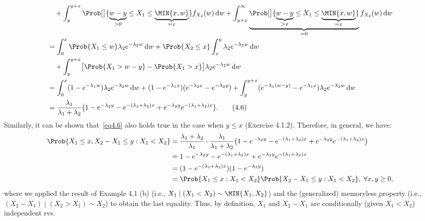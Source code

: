 \begin{Example}
\begin{align*}
         & \quad+\int_{y}^{y+x}\Prob[\big]{\underbrace{w-y}_{>0}\le X_1\le \underbrace{\MIN{x,w}}_{=x}}f_{X_2}(w)\odif{w}+\int_{y+x}^{\infty}\underbrace{\Prob[\big]{\underbrace{w-y}_{>x}\le X_1\le \underbrace{\MIN{x,w}}_{=x}}}_{=0}f_{X_2}(w)\odif{w} \\
         & =\int_{0}^{x}\Prob{X_1\le w}\lambda_2 e^{-\lambda_2 w}\odif{w}+\Prob{X_2\le x}\int_{x}^{y}\lambda_2 e^{-\lambda_2 w}\odif{w}                                                                                                                   \\
         & \quad+\int_{y}^{y+x}\bigl[\Prob{X_1>w-y}-\Prob{X_1>x}\bigr]\lambda_2 e^{-\lambda_2 w}\odif{w}                                                                                                                                                  \\
         & =\int_{0}^{x}(1-e^{-\lambda_1 w})\lambda_2 e^{-\lambda_2 w}\odif{w}+(1-e^{-\lambda_1 x})(e^{-\lambda_2 x}-e^{-\lambda_2 y})+\int_{y}^{y+x}(e^{-\lambda_1(w-y)}-e^{-\lambda_1 x})\lambda_2 e^{-\lambda_2 w}\odif{w}                             \\
         & =\frac{\lambda_1}{\lambda_1+\lambda_2}\bigl(1-e^{-\lambda_2 y}-e^{-(\lambda_1+\lambda_2)x}+e^{-\lambda_2 y}e^{-(\lambda_1+\lambda_2)x}\bigr).\tag*{(4.6)}\label{eq4.6}
    \end{align*}
    Similarly, it can be shown that~\ref{eq4.6} also holds true in the case when $ y\le x $ (Exercise 4.1.2).
    Therefore, in general, we have:
    \begin{align*}
        \Prob{X_1\le x,X_2-X_1\le y\given X_1<X_2}
         & =\frac{\lambda_1+\lambda_2}{\lambda_1}\cdot \frac{\lambda_1}{\lambda_1+\lambda_2}\bigl(1-e^{-\lambda_2 y}-e^{-(\lambda_1+\lambda_2)x}+e^{-\lambda_2 y}e^{-(\lambda_1+\lambda_2)x}\bigr) \\
         & =1-e^{-\lambda_2 y}-e^{-(\lambda_1+\lambda_2)x}+e^{-\lambda_2 y}e^{-(\lambda_1+\lambda_2)x}                                                                                             \\
         & =(1-e^{-(\lambda_1+\lambda_2)x})(1-e^{-\lambda_2 y})                                                                                                                                    \\
         & =\Prob{X_1\le x\given X_1<X_2}\Prob{X_2-X_1\le y\given X_1<X_2},\;\forall x,y\ge 0,
    \end{align*}
    where we applied the result of Example 4.1 (b) (i.e., $ X_1\mid(X_1<X_2)\sim \MIN{X_1,X_2} $) and the (generalized) memoryless property
    (i.e., $ (X_2-X_1)\mid(X_2>X_1)\sim X_2 $) to obtain the last equality. Thus, by definition, $ X_1 $ and $ X_2-X_1 $
    are conditionally (given $ X_1<X_2 $) independent rvs.
\end{Example}
